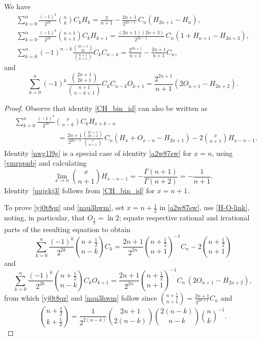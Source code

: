 \documentclass[12pt,reqno]{article}
\begin{document}
\begin{corollary}
We have
\begin{gather}
\sum_{k=0}^n \frac{(-1)^k}{2^{2k}} \binom{n}{k}  C_k H_{k} = \frac{2}{n+1} - \frac{2n+1}{2^{2n-1}}\,C_n (H_{2n+1}-H_n) \label{nwg1l9g},\\
\sum_{k=0}^n \frac{(-1)^k}{2^{2k}} \binom{n+1}{k+1} C_k H_{k+1} = \frac{(2n+1)(2n+3)}{2^{2n-1}}\, C_n (1 + H_{n+1} - H_{2n+3}),\label{uujgkj3}\\
\sum_{k = 0}^n (-1)^{n-k} \frac{\binom{2n+1}{2k}}{\binom{n+1}{k+1}} C_k C_{n-k} = \frac{2^{2n + 1}}{n + 1} - \frac{2n+1}{n+1}C_n, \label{yj0t8qz}
\end{gather}
and
\begin{equation}\label{nau3hwm}
\sum_{k = 0}^n (-1)^{k} \frac{\binom{2n+1}{2k+1}}{\binom{n+1}{n-k+1}} C_k C_{n-k} O_{k+1} = \frac{2^{2n + 1}}{n + 1} (2O_{n+1}-H_{2n+2}). 
\end{equation}
\end{corollary}
\begin{proof}
	Observe that identity \eqref{CH_bin_id} can also be written as
	\begin{align}\label{a2w87sw}
	&\sum_{k=0}^n \frac{(-1)^k}{2^{2k}} \binom{x}{n-k}  C_k H_{x+k-n}  \nonumber \\
	&\qquad\qquad\qquad= \frac{2n+1}{2^{2n-1}} \frac{\binom{2x+1}{2n+2}}{\binom{x}{n+1}}  \,C_n ( H_x + O_{x-n} - H_{2x+1}) - 2 \binom{x}{n+1} H_{x-n-1}.  
	\end{align}
	Identity \eqref{nwg1l9g} is a special case of identity \eqref{a2w87sw} for $x=n$, using \eqref{vmrppnb} and calculating
	$$\lim_{x\rightarrow n} \binom{x}{n+1} H_{x-n-1} = - \frac{\Gamma(n+1)}{\Gamma(n+2)} = - \frac{1}{n+1}.$$
	Identity~\eqref{uujgkj3} follows from \eqref{CH_bin_id} for $x=n+1$.
	
	To prove \eqref{yj0t8qz} and \eqref{nau3hwm}, set $x=n+\frac12$ in \eqref{a2w87sw}, use \eqref{H-O-link}, noting, in particular, 
	that $O_{\frac12}=\ln 2$; equate respective rational and irrational parts of the resulting equation to obtain
	\begin{equation*}
	\sum_{k = 0}^n \frac{(-1)^k}{2^{2k}} \binom{{n + \frac12}}{n - k}  C_k = \frac{2n + 1}{2^{2n}} \binom{{n + \frac12}}{{n + 1}}^{- 1} C_n - 2\binom{{n + \frac12}}{n + 1}
	\end{equation*}
and
	\begin{equation*}
	\sum_{k = 0}^n \frac{(- 1)^k}{2^{2k}} \binom{{n + \frac12}}{{n - k}}  C_k O_{k + 1} = 
	\frac{2n + 1}{2^{2n}} \binom{{n + \frac12}}{{n + 1}}^{- 1} C_n\, ( 2O_{n + 1} - H_{2n + 2}),
	\end{equation*}
from which \eqref{yj0t8qz} and \eqref{nau3hwm} follow since
	$	\binom{{n + \frac12}}{{n + 1}} = \frac{{2n + 1}}{{2^{2n + 1} }}C_n $
	and
	\begin{equation*}
\binom{n + \frac12}{k+\frac12} = \frac{1}{2^{2( n - k)} }
\binom{2n+1}{2(n-k)} \binom{{2( n - k)}}{n - k}\binom{{n}}{k}^{ - 1} .
\end{equation*}
\end{proof}
\end{document}
